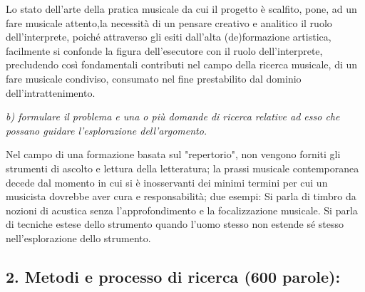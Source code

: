 \documentclass{gs-adonis}
\begin{document}
Lo stato dell'arte della pratica musicale da cui il progetto è scalfito, pone,
ad un fare musicale attento,la necessità di un pensare creativo e analitico il
ruolo dell'interprete, poiché attraverso gli esiti dall'alta (de)formazione
artistica, facilmente si confonde la figura dell'esecutore con il ruolo
dell'interprete, precludendo così fondamentali contributi nel campo della
ricerca musicale, di un fare musicale condiviso, consumato nel fine
prestabilito dal dominio dell'intrattenimento.

%
%
%
%

\emph{b) formulare il problema e una o più domande di ricerca relative ad esso che possano guidare l’esplorazione dell’argomento.}

Nel campo di una formazione basata sul "repertorio", non vengono forniti gli strumenti
di ascolto e lettura della letteratura; la prassi musicale contemporanea decede dal
momento in cui si è inosservanti dei minimi termini per cui un musicista dovrebbe aver
cura e responsabilità; due esempi:
Si parla di timbro da nozioni di acustica senza l'approfondimento e la focalizzazione musicale.
Si parla di tecniche estese dello strumento quando l'uomo stesso non estende sé stesso
nell'esplorazione dello strumento.

\subsection{2. Metodi e processo di ricerca (600 parole):}
\end{document}
